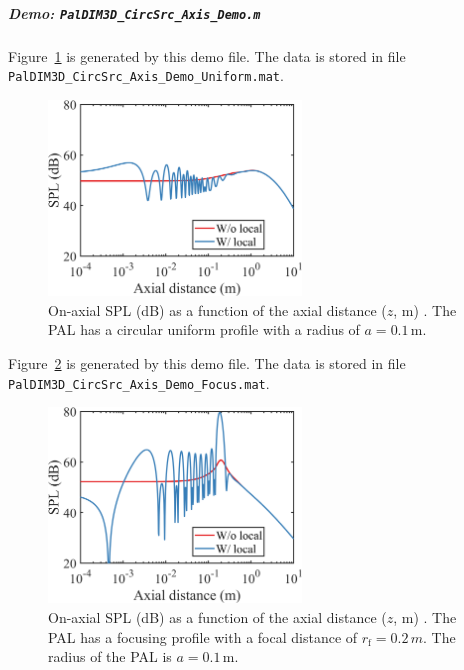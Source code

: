 \documentclass[12pt]{article}
\begin{document}
\subparagraph{Demo: \lstinline!PalDIM3D_CircSrc_Axis_Demo.m!}
Figure~\ref{fig:dim:uniform:32oj4} is generated by this demo file.
The data is stored in file \lstinline!PalDIM3D_CircSrc_Axis_Demo_Uniform.mat!.
\begin{figure}[!htb]
    \centering
    \includegraphics[width = 0.6\textwidth]{../code/DIM/fig/PalDIM3D_CircSrc_Axis_Demo_Uniform.png}
    \caption{On-axial SPL (dB) as a function of the axial distance ($z$, m) \cite[Fig.~2(d)]{Zhong2022LowFrequencyAudio}.
    The PAL has a circular uniform profile with a radius of $a=0.1\,\mathrm{m}$.
    }
    \label{fig:dim:uniform:32oj4}
\end{figure}

Figure~\ref{fig:dim:focus:32oj4} is generated by this demo file.
The data is stored in file \lstinline!PalDIM3D_CircSrc_Axis_Demo_Focus.mat!.
\begin{figure}[!htb]
    \centering
    \includegraphics[width = 0.6\textwidth]{../code/DIM/fig/PalDIM3D_CircSrc_Axis_Demo_Focus.png}
    \caption{On-axial SPL (dB) as a function of the axial distance ($z$, m) \cite[Fig.~2(e)]{Zhong2022LowFrequencyAudio}.
    The PAL has a focusing profile with a focal distance of $r_\mathrm{f} = 0.2\,{m}$.
    The radius of the PAL is $a=0.1\,\mathrm{m}$.
    }
    \label{fig:dim:focus:32oj4}
\end{figure}
\end{document}
